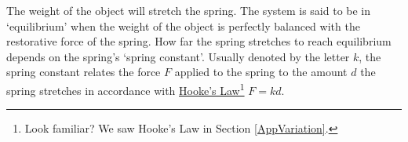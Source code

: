 \documentclass{ximera}
\begin{document}
\begin{image}
\end{image}

The weight of the object will stretch the spring.   The system is said to be in `equilibrium' when the weight of the object is perfectly balanced with the restorative force of the spring.  How far the spring stretches to reach equilibrium depends on the spring's `spring constant'. Usually denoted by the letter $k$, the spring constant relates the force $F$ applied to the spring to the amount $d$ the spring stretches in accordance with \href{http://en.wikipedia.org/wiki/Hooke's_law}{\underline{Hooke's Law}}\footnote{Look familiar?  We saw Hooke's Law in Section \ref{AppVariation}.} $F = kd$.  

 
\end{document}
